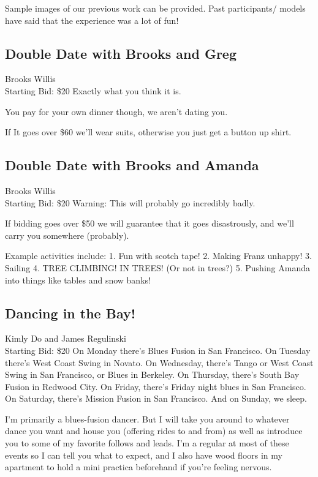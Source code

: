 \documentclass[11pt]{article}
\begin{document}
Sample images of our previous work can be provided. Past participants/ models have said that the experience was a lot of fun!
\subsection{Double Date with Brooks and Greg}
Brooks Willis
\\
Starting Bid: \$20
\newline
Exactly what you think it is. 

You pay for your own dinner though, we aren't dating you. 

If It goes over \$60 we'll wear suits, otherwise you just get a button up shirt.
\subsection{Double Date with Brooks and Amanda}
Brooks Willis
\\
Starting Bid: \$20
\newline
Warning: This will probably go incredibly badly.

If bidding goes over \$50 we will guarantee that it goes disastrously, and we'll carry you somewhere (probably).

Example activities include:
1. Fun with scotch tape!
2. Making Franz unhappy!
3. Sailing 
4. TREE CLIMBING! IN TREES! (Or not in trees?)
5. Pushing Amanda into things like tables and snow banks!
\subsection{Dancing in the Bay!}
Kimly Do and James Regulinski
\\
Starting Bid: \$20
\newline
On Monday there's Blues Fusion in San Francisco.
On Tuesday there's West Coast Swing in Novato.
On Wednesday, there's Tango or West Coast Swing in San Francisco, or Blues in Berkeley.
On Thursday, there's South Bay Fusion in Redwood City.
On Friday, there's Friday night blues in San Francisco.
On Saturday, there's Mission Fusion in San Francisco.
And on Sunday, we sleep.

I'm primarily a blues-fusion dancer. But I will take you around to whatever dance you want and house you (offering rides to and from) as well as introduce you to some of my favorite follows and leads.
I'm a regular at most of these events so I can tell you what to expect, and I also have wood floors in my apartment to hold a mini practica beforehand if you're feeling nervous.
\end{document}

